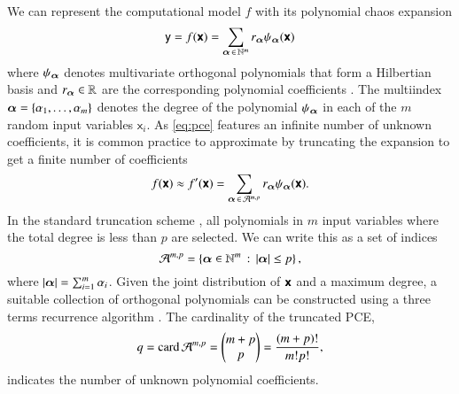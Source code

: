 We can represent the computational model $f$ with its polynomial chaos expansion
\begin{equation}
    \mathsf{y} = f(\boldsymbol{\mathsf{x}}) = \sum_{{\bm{\alpha}} \,\in\, \mathbb{N}^m} r_{{\bm{\alpha}}} \psi_{{\bm{\alpha}}}(\boldsymbol{\mathsf{x}})
    \label{eq:pce}
\end{equation}
where $\psi_{\bm{\alpha}}$ denotes multivariate orthogonal polynomials that form
a Hilbertian basis and $r_{\bm{\alpha}} \in \mathbb{R}$ are the corresponding polynomial coefficients \cite{sudret_global_2008}. The multiindex ${\bm{\alpha}} = \{\alpha_1,\dots,\alpha_m\}$ 
denotes the degree of the polynomial $\psi_{\bm{\alpha}}$ in each of the $m$ random input variables $\mathsf{x}_i$.
As \cref{eq:pce} features an infinite number of unknown coefficients,
it is common practice to approximate by truncating the expansion to get a finite number of coefficients
\begin{equation}
    f(\boldsymbol{\mathsf{x}}) \approx f'(\boldsymbol{\mathsf{x}}) = \sum_{{\bm{\alpha}} \,\in\, \mathcal{A}^{m,p}} r_{\bm{\alpha}} \psi_{\bm{\alpha}}(\boldsymbol{\mathsf{x}}).
\end{equation}
In the standard truncation scheme \cite{gratiet_metamodel-based_2015,sudret_global_2008},
all polynomials in $m$ input variables where the total degree is less than $p$ are selected.
We can write this as a set of indices
\begin{equation}
    \mathcal{A}^{m,p} = \left\{{\bm{\alpha}} \in \mathbb{N}^m \,:\, \left|{\bm{\alpha}}\right| \leq p\right\},
\end{equation}
where $\left|{\bm{\alpha}}\right| = \sum_{i=1}^m \alpha_i$.
Given the joint distribution of $\boldsymbol{\mathsf{x}}$ and a maximum degree,
a suitable collection of orthogonal polynomials can be constructed
using a three terms recurrence algorithm \cite{feinberg_chaospy_2015}.
The cardinality of the truncated PCE,
\begin{equation}
    q = \text{card}\, \mathcal{A}^{m,p} = \left(\begin{matrix}
        m+p \\
        p
    \end{matrix}\right) = \frac{(m+p)!}{m!p!},
    \label{eq:cardinality}
\end{equation}
indicates the number of unknown polynomial coefficients.


